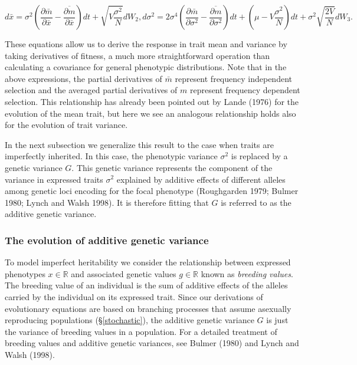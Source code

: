 \documentclass[]{article}
\begin{document}
\begin{subequations}\label{no_inher}
\begin{equation}\label{xbar}
d\bar x=\sigma^2\left(\frac{\partial\bar m}{\partial\bar x}-\overline{\frac{\partial m}{\partial\bar x}}\right)dt+\sqrt{V\frac{\sigma^2}{N}}dW_2,
\end{equation}
\begin{equation}\label{G}
d\sigma^2=2\sigma^4\left(\frac{\partial\bar m}{\partial\sigma^2}-\overline{\frac{\partial m}{\partial\sigma^2}}\right)dt +\left(\mu-V\frac{\sigma^2}{N}\right)dt+\sigma^2\sqrt{\frac{2V}{N}}dW_3.
\end{equation}
\end{subequations}

These equations allow us to derive the response in trait mean and
variance by taking derivatives of fitness, a much more straightforward
operation than calculating a covariance for general phenotypic
distributions. Note that in the above expressions, the partial
derivatives of \(\bar m\) represent frequency independent selection and
the averaged partial derivatives of \(m\) represent frequency dependent
selection. This relationship has already been pointed out by Lande
(1976) for the evolution of the mean trait, but here we see an analogous
relationship holds also for the evolution of trait variance.

In the next subsection we generalize this result to the case when traits
are imperfectly inherited. In this case, the phenotypic variance
\(\sigma^2\) is replaced by a genetic variance \(G\). This genetic
variance represents the component of the variance in expressed traits
\(\sigma^2\) explained by additive effects of different alleles among
genetic loci encoding for the focal phenotype (Roughgarden 1979; Bulmer
1980; Lynch and Walsh 1998). It is therefore fitting that \(G\) is
referred to as the additive genetic variance.

\hypertarget{the-evolution-of-additive-genetic-variance}{%
\subsubsection{\texorpdfstring{The evolution of additive genetic
variance
\label{inheritance}}{The evolution of additive genetic variance }}\label{the-evolution-of-additive-genetic-variance}}

To model imperfect heritability we consider the relationship between
expressed phenotypes \(x\in\mathbb{R}\) and associated genetic values
\(g\in\mathbb{R}\) known as \emph{breeding values}. The breeding value
of an individual is the sum of additive effects of the alleles carried
by the individual on its expressed trait. Since our derivations of
evolutionary equations are based on branching processes that assume
asexually reproducing populations (\S\ref{stochastic}), the additive
genetic variance \(G\) is just the variance of breeding values in a
population. For a detailed treatment of breeding values and additive
genetic variances, see Bulmer (1980) and Lynch and Walsh (1998).
\end{document}
